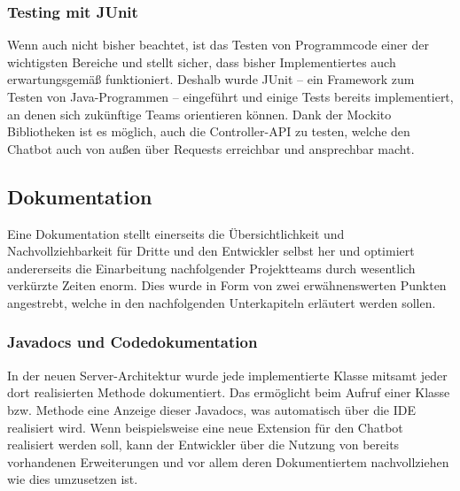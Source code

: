 		\subsubsection{Testing mit JUnit}
			Wenn auch nicht bisher beachtet, ist das Testen von Programmcode einer der
			wichtigsten Bereiche und stellt sicher, dass bisher Implementiertes auch
			erwartungsgemäß funktioniert. Deshalb wurde JUnit – ein Framework zum Testen
			von Java-Programmen – eingeführt und einige Tests bereits implementiert, an
			denen sich zukünftige Teams orientieren können. Dank der Mockito
			Bibliotheken ist es möglich, auch die Controller-API zu testen, welche den
			Chatbot auch von außen über Requests erreichbar und ansprechbar macht.

	\subsection{Dokumentation}
		Eine Dokumentation stellt einerseits die Übersichtlichkeit und
		Nachvollziehbarkeit für Dritte und den Entwickler selbst her und optimiert
		andererseits die Einarbeitung nachfolgender Projektteams durch wesentlich
		verkürzte Zeiten enorm. Dies wurde in Form von zwei erwähnenswerten Punkten
		angestrebt, welche in den nachfolgenden Unterkapiteln erläutert werden
		sollen.
		
		\subsubsection{Javadocs und Codedokumentation}
			In der neuen Server-Architektur wurde jede implementierte Klasse mitsamt
			jeder dort realisierten Methode dokumentiert. Das ermöglicht beim Aufruf
			einer Klasse bzw. Methode eine Anzeige dieser Javadocs, was automatisch über
			die IDE realisiert wird. Wenn beispielsweise eine neue Extension für den
			Chatbot realisiert werden soll, kann der Entwickler über die Nutzung von
			bereits vorhandenen Erweiterungen und vor allem deren Dokumentiertem
			nachvollziehen wie dies umzusetzen ist.


